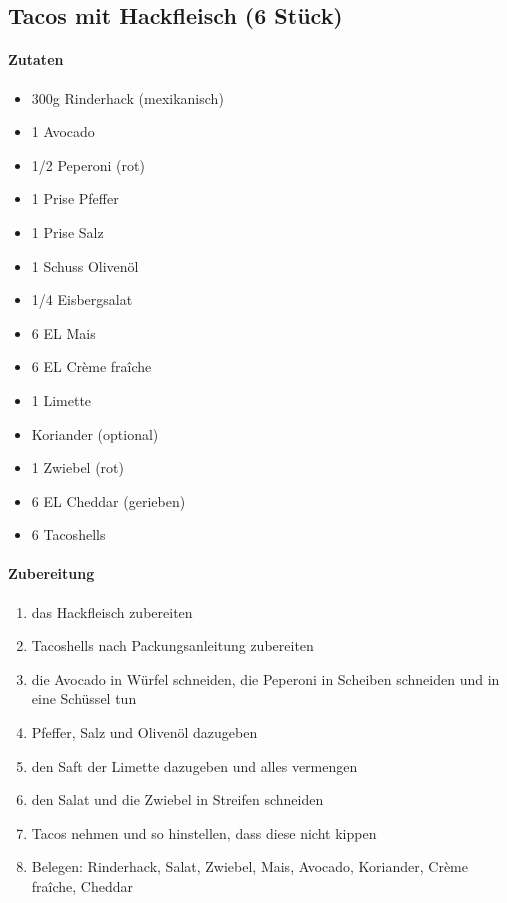 \newpage
\subsection{Tacos mit Hackfleisch (6 Stück)}
\paragraph{Zutaten}
\begin{itemize}[noitemsep]
	\item 300g Rinderhack (mexikanisch)
	\item 1 Avocado
	\item 1/2 Peperoni (rot)
	\item 1 Prise Pfeffer
	\item 1 Prise Salz
	\item 1 Schuss Olivenöl
	\item 1/4 Eisbergsalat
	\item 6 EL Mais
	\item 6 EL Crème fraîche 
	\item 1 Limette
	\item Koriander (optional)
	\item 1 Zwiebel (rot)
	\item 6 EL Cheddar (gerieben)
	\item 6 Tacoshells
\end{itemize}
\paragraph{Zubereitung}
\begin{enumerate}[noitemsep]
	\item das Hackfleisch zubereiten
	\item Tacoshells nach Packungsanleitung zubereiten  
	\item die Avocado in Würfel schneiden, die Peperoni in Scheiben schneiden und in eine Schüssel tun
	\item Pfeffer, Salz und Olivenöl dazugeben
	\item den Saft der Limette dazugeben und alles vermengen
	\item den Salat und die Zwiebel in Streifen schneiden
	\item Tacos nehmen und so hinstellen, dass diese nicht kippen 
	\item Belegen: Rinderhack, Salat, Zwiebel, Mais, Avocado, Koriander, Crème fraîche, Cheddar
\end{enumerate}
